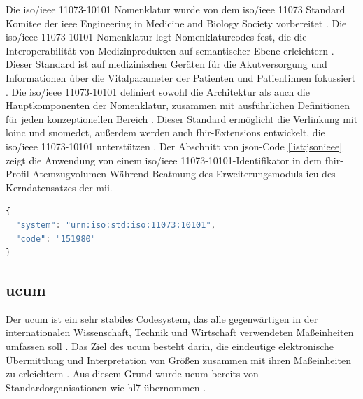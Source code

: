Die \acs{iso}/\ac{ieee} 11073-10101\texttrademark{} Nomenklatur wurde von dem \acs{iso}/\ac{ieee} 11073\texttrademark{} Standard Komitee der \glqq \ac{ieee} Engineering in Medicine and Biology Society\grqq{} vorbereitet \cite{ieeeiso}. Die \acs{iso}/\ac{ieee} 11073-10101\texttrademark{} Nomenklatur legt Nomenklaturcodes fest, die die Interoperabilität von Medizinprodukten auf semantischer Ebene erleichtern \cite{ieeearch}. Dieser Standard ist auf medizinischen Geräten für die Akutversorgung und Informationen über die Vitalparameter der Patienten und Patientinnen fokussiert \cite{ieeeiso}. Die \acs{iso}/\ac{ieee} 11073-10101\texttrademark{} definiert sowohl die Architektur als auch die Hauptkomponenten der Nomenklatur, zusammen mit ausführlichen Definitionen für jeden konzeptionellen Bereich \cite{ieeesa}. Dieser Standard ermöglicht die Verlinkung mit \ac{loinc} und \ac{snomedct}, außerdem werden auch \ac{fhir}-Extensions entwickelt, die \acs{iso}/\ac{ieee} 11073-10101\texttrademark{} unterstützen \cite{ieeeextending}. Der Abschnitt von \ac{json}-Code \ref{list:jsonieee} zeigt die Anwendung von einem \acs{iso}/\ac{ieee} 11073-10101\texttrademark{}-Identifikator in dem \ac{fhir}-Profil \glqq Atemzugvolumen-Während-Beatmung\grqq{} des Erweiterungsmoduls \glqq\ac{icu}\grqq{} des Kerndatensatzes der \ac{mii}.


\begin{lstlisting}[caption={[\acs{iso}/\acs{ieee} 11073-10101\texttrademark{} in \acs{fhir}] Beispiel der Anwendung von \acs{iso}/\acs{ieee} 11073-10101\texttrademark{} in \acs{fhir}.},language=JavaScript, label=list:jsonieee, captionpos=b]
{
  "system": "urn:iso:std:iso:11073:10101",
  "code": "151980"
}
\end{lstlisting}


\subsection{\acs{ucum}} \label{sub:ucum}

Der \ac{ucum} ist ein sehr stabiles Codesystem, das alle gegenwärtigen in der internationalen Wissenschaft, Technik und Wirtschaft verwendeten Maßeinheiten umfassen soll \cite{ucumwebnih}. Das Ziel des \ac{ucum} besteht darin, die eindeutige elektronische Übermittlung und Interpretation von Größen zusammen mit ihren Maßeinheiten zu erleichtern \cite{ucumwebnih, ucumweb}. Aus diesem Grund wurde \ac{ucum} bereits von Standardorganisationen wie \ac{hl7} übernommen \cite{ucumweb}.